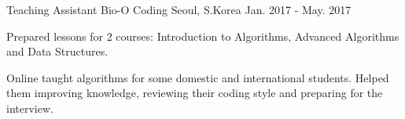 \begin{cventries}
  \cventry
    {Teaching Assistant} %
    {Bio-O Coding} %
    {Seoul, S.Korea} %
    {Jan. 2017 - May. 2017} %
    {
      \begin{cvitems} %
        \item {Prepared lessons for 2 courses: Introduction to Algorithms, Advanced Algorithms and Data Structures.}
        \item {Online taught algorithms for some domestic and international students. Helped them improving knowledge, reviewing their coding style and preparing for the interview.}
      \end{cvitems}
    }

\end{cventries}
